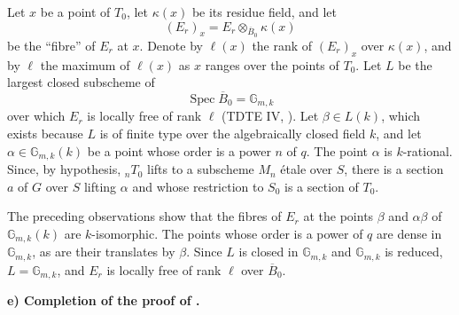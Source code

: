 
Let \(x\) be a point of \(T_0\), let \(\kappa(x)\) be its residue
field, and let
\[
  (E_r)_x=E_r\otimes_{\overline B_0}\kappa(x)
\]
be the ``fibre'' of \(E_r\) at \(x\). Denote by \(\ell(x)\) the rank
of \((E_r)_x\) over \(\kappa(x)\), and by \(\ell\) the maximum of
\(\ell(x)\) as \(x\) ranges over the points of \(T_0\). Let \(L\) be
the largest closed subscheme of
\[
  \operatorname{Spec}\overline B_0=\mathbb G_{m,k}
\]
over which \(E_r\) is locally free of rank \(\ell\) (TDTE IV, ). Let \(\beta\in L(k)\), which exists because \(L\) is of finite
type over the algebraically closed field \(k\), and let
\(\alpha\in\mathbb G_{m,k}(k)\) be a point whose order is a power
\(n\) of \(q\). The point \(\alpha\) is \(k\)-rational. Since, by
hypothesis, \({}_nT_0\) lifts to a subscheme \(M_n\) étale over \(S\),
there is a section \(a\) of \(G\) over \(S\) lifting \(\alpha\) and
whose restriction to \(S_0\) is a section of \(T_0\).

The preceding observations show that the fibres of \(E_r\) at the
points \(\beta\) and \(\alpha\beta\) of \(\mathbb G_{m,k}(k)\) are
\(k\)-isomorphic. The points whose order is a power of \(q\) are dense
in \(\mathbb G_{m,k}\), as are their translates by \(\beta\). Since
\(L\) is closed in \(\mathbb G_{m,k}\) and \(\mathbb G_{m,k}\) is
reduced, \(L=\mathbb G_{m,k}\), and \(E_r\) is locally free of rank
\(\ell\) over \(\overline B_0\).

\medskip\noindent\textbf{e) Completion of the proof of .}

